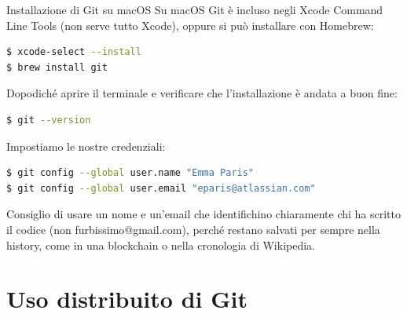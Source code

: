 \documentclass[aspectratio=169,handout,10pt]{beamer}
\begin{document}
\begin{frame}[fragile]{Installazione di Git su macOS}
    Su macOS Git è incluso negli Xcode Command Line Tools (non serve tutto Xcode), oppure si può installare con Homebrew:
    \begin{lstlisting}[language=bash]
$ xcode-select --install
$ brew install git\end{lstlisting}

    Dopodiché aprire il terminale e verificare che l'installazione è andata a buon fine:
    \begin{lstlisting}[language=bash]
$ git --version\end{lstlisting}
    Impostiamo le nostre credenziali:
    \begin{lstlisting}[language=bash]
$ git config --global user.name "Emma Paris"
$ git config --global user.email "eparis@atlassian.com"\end{lstlisting}
    
    Consiglio di usare un nome e un'email che identifichino chiaramente chi ha scritto il codice (non furbissimo@gmail.com), perché restano salvati per sempre nella history, come in una blockchain o nella cronologia di Wikipedia.
\end{frame}

\section{Uso distribuito di Git}
\end{document}
